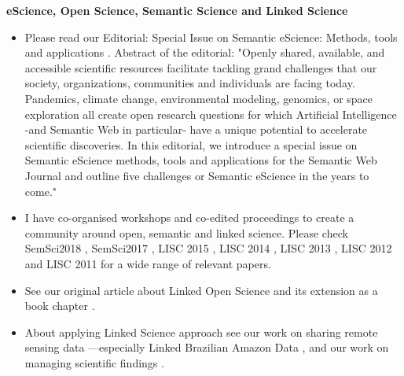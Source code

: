 \documentclass[11pt,letterpaper]{article}
\begin{document}
\textbf{eScience, Open Science, Semantic Science and Linked Science}
\begin{itemize}
\item Please read our Editorial: Special Issue on Semantic eScience: Methods, tools and applications \cite{Semantic-eScience-SWJ-2020}. Abstract of the editorial: "Openly shared, available, and accessible scientific resources facilitate tackling grand challenges that our society, organizations, communities and individuals are facing today. Pandemics, climate change, environmental modeling, genomics, or space exploration all create open research questions for which Artificial Intelligence -and Semantic Web in particular- have a unique potential to accelerate scientific discoveries. In this editorial, we introduce a special issue on Semantic eScience methods, tools and applications for the Semantic Web Journal and outline five challenges or Semantic eScience in the years to come."
\item I have co-organised workshops and co-edited proceedings to create a community around open, semantic and linked science. Please check SemSci2018 \cite{semsci2018},
SemSci2017 \cite{semsci2017}, LISC 2015 \cite{lisc2015}, LISC 2014 \cite{lisc2014}, LISC 2013 \cite{lisc2013}, LISC 2012
\cite{lisc2012} and LISC 2011 \cite{lisc2011} for a wide range of relevant papers.
\item See our original article about Linked Open Science \cite{LinkedOpenScience2011} and its extension as a book chapter \cite{kauppinen-et-al-linked-science-2013}.
\item About applying Linked Science approach see our work on sharing remote sensing data
		\cite{kauppinen-remote-sensing-data-2012}---especially Linked Brazilian Amazon Data \cite{kauppinen-et-al-linked-brazilian-amazon-2014}, and our work on managing scientific findings \cite{baglatzi-kauppinen-ekaw2012-2012}.


\end{itemize}
\end{document}
